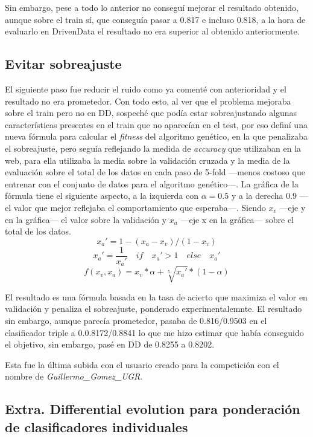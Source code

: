 \documentclass{article}
\newcommand{\img}[2]{
\noindent\makebox[\textwidth][c]{\texttt{[image: imgs/\#1]}}%
}
\begin{document}
Sin embargo, pese a todo lo anterior no conseguí mejorar el resultado obtenido, aunque sobre el train sí, que conseguía pasar a 0.817 e incluso 0.818, a la hora de evaluarlo en DrivenData el resultado no era superior al obtenido anteriormente. 

\subsection{Evitar sobreajuste}

El siguiente paso fue reducir el ruido como ya comenté con anterioridad y el resultado no era prometedor. Con todo esto, al ver que el problema mejoraba sobre el train pero no en DD, sospeché que podía estar sobreajustando algunas características presentes en el train que no aparecían en el test, por eso definí una nueva fórmula para calcular el \textit{fitness} del algoritmo genético, en la que penalizaba el sobreajuste, pero seguía reflejando la medida de \textit{accuracy} que utilizaban en la web, para ella utilizaba la media sobre la validación cruzada y la media de la evaluación sobre el total de los datos en cada paso de 5-fold ---menos costoso que entrenar con el conjunto de datos para el algoritmo genético---. La gráfica de la fórmula tiene el siguiente aspecto, a la izquierda con $\alpha=0.5$ y a la derecha $0.9$ ---el valor que mejor reflejaba el comportamiento que esperaba---. Siendo $x_v$ ---eje y en la gráfica--- el valor sobre la validación y $x_a$ ---eje x en la gráfica--- sobre el total de los datos.
\[ x_a' = 1 - (x_a - x_v)/(1 - x_v) \]
\[ x_a' = \frac{1}{x_a'} \quad if \quad x_a' > 1 \quad else \quad x_a' \]
\[ f(x_v,x_a) = x_v*\alpha + \sqrt[5]{x_a'}*(1-\alpha)\]

\img{form1}{0.9}

El resultado es una fórmula basada en la tasa de acierto que maximiza el valor en validación y penaliza el sobreajuste, ponderado experimentalemnte. El resultado sin embargo, aunque parecía prometedor, pasaba de 0.816/0.9503 en el clasificador triple a 0.0.8172/0.8841 lo que me hizo estimar que había conseguido el objetivo, sin embargo, pasé en DD de 0.8255 a 0.8202.

Esta fue la última subida con el usuario creado para la competición con el nombre de \textit{Guillermo\_Gomez\_UGR}.

\subsection{Extra. Differential evolution para ponderación de clasificadores individuales}
\end{document}
